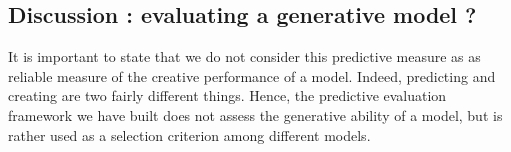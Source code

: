 \documentclass{article}
\begin{document}
\subsection{Discussion : evaluating a generative model ?}
It is important to state that we do not consider this predictive measure as as reliable measure of the creative performance of a model. Indeed, predicting and creating are two fairly different things. 
Hence, the predictive evaluation framework we have built does not assess the generative ability of a model, but is rather used as a selection criterion among different models.

%
%
%
\end{document}
